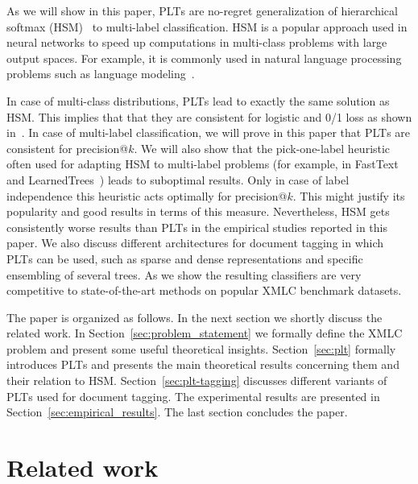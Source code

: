\documentclass{article}
\newcommand{\Algo}[1]{\textsc{#1}}
\newcommand{\sectionBefore}{-0pt}
\newcommand{\sectionAfter}{-0pt}
\begin{document}
As we will show in this paper, \Algo{PLT}s are no-regret generalization of hierarchical softmax (HSM)~\citep{Morin_Bengio_2005} to multi-label classification. HSM is a popular approach used in neural networks to speed up computations in multi-class problems with large output spaces. For example, it is commonly used in natural language processing problems such as language modeling~\citep{Mikolov_et_al_2013}.  


In case of multi-class distributions, \Algo{PLT}s lead to exactly the same solution as HSM. This implies that that they are consistent for logistic and 0/1 loss as shown in~\citep{Dembczynski_et_al_2016}. In case of multi-label classification, we will prove in this paper that \Algo{PLT}s are consistent for precision@$k$. We will also show that the pick-one-label heuristic often used for adapting \Algo{HSM} to multi-label problems (for example, in FastText~\citep{Joulin_et_al_2016} and LearnedTrees~\citep{Jernite_et_al_2017}) leads to suboptimal results. Only in case of label independence this heuristic acts optimally for precision@$k$. This might justify its popularity and good results in terms of this measure. Nevertheless, \Algo{HSM} gets consistently worse results than \Algo{PLT}s in the empirical studies reported in this paper. 
%
We also discuss different architectures for document tagging in which \Algo{PLT}s can be used, such as sparse and dense representations and specific ensembling of several trees. As we show the resulting classifiers are very competitive to state-of-the-art methods on popular XMLC benchmark datasets. 

The paper is organized as follows. In the next section we shortly discuss the related work. In Section~\ref{sec:problem_statement} we formally define the XMLC problem and present some useful theoretical insights. Section~\ref{sec:plt} formally introduces \Algo{PLT}s and presents the main theoretical results concerning them and their relation to \Algo{HSM}. Section~\ref{sec:plt-tagging} discusses different variants of \Algo{PLT}s used for document tagging. The experimental results are presented in Section~\ref{sec:empirical_results}. The last section concludes the paper. 


\vspace{\sectionBefore}
\section{Related work}
\label{sec:related_work}
\vspace{\sectionAfter}
\end{document}
